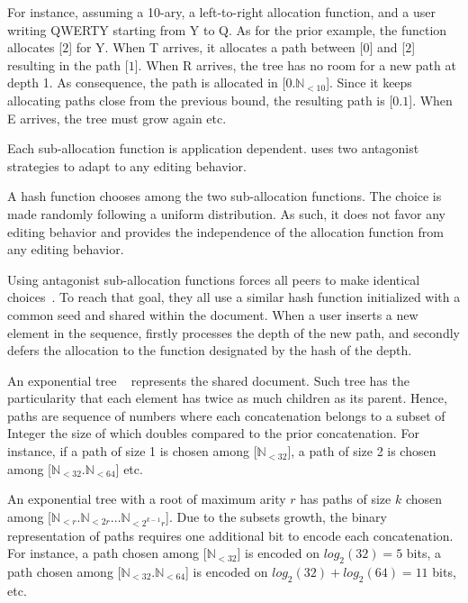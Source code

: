 \begin{asparadesc}
  For instance, assuming a 10-ary, a left-to-right allocation function, and a
  user writing QWERTY starting from Y to Q. As for the prior example, the
  function allocates [$2$] for Y. When T arrives, it allocates a path between
  [$0$] and [$2$] resulting in the path [$1$]. When R arrives, the tree has no
  room for a new path at depth 1. As consequence, the path is allocated in
  [$0.\mathbb{N}_{<10}$]. Since it keeps allocating paths close from the
  previous bound, the resulting path is [$0.1$]. When E arrives, the tree must
  grow again etc.

  Each sub-allocation function is application dependent.  \LSEQ uses two
  antagonist strategies to adapt to any editing behavior. 

\item [A hash function] chooses among the two sub-allocation functions. The
  choice is made randomly following a uniform distribution. As such, it does not
  favor any editing behavior and provides the independence of the allocation
  function from any editing behavior.

  Using antagonist sub-allocation functions forces all peers to make identical
  choices~\cite{nedelec2013concurrency}. To reach that goal, they all use a
  similar hash function initialized with a common seed and shared within the
  document. When a user inserts a new element in the sequence, \LSEQ firstly
  processes the depth of the new path, and secondly defers the allocation to the
  function designated by the hash of the depth.

\item [An exponential tree]~\cite{andersson1996faster, andersson2007dynamic}
  represents the shared document. Such tree has the particularity that each
  element has twice as much children as its parent.  Hence, paths are sequence
  of numbers where each concatenation belongs to a subset of Integer the size of
  which doubles compared to the prior concatenation. For instance, if a path of
  size 1 is chosen among [$\mathbb{N}_{<32}$], a path of size 2 is chosen among
  [$\mathbb{N}_{<32}.\mathbb{N}_{<64}$] etc.

  An exponential tree with a root of maximum arity $r$ has paths of size $k$
  chosen among [$\mathbb{N}_{<r}.\mathbb{N}_{<2r}\ldots\mathbb{N}_{<2^{k-1}r}$].
  Due to the subsets growth, the binary representation of paths requires one
  additional bit to encode each concatenation. For instance, a path chosen among
  [$\mathbb{N}_{<32}$] is encoded on $log_2(32)=5$ bits, a path chosen among
  [$\mathbb{N}_{<32}.\mathbb{N}_{<64}$] is encoded on $log_2(32)+log_2(64)=11$
  bits, etc.
  

\end{asparadesc}
